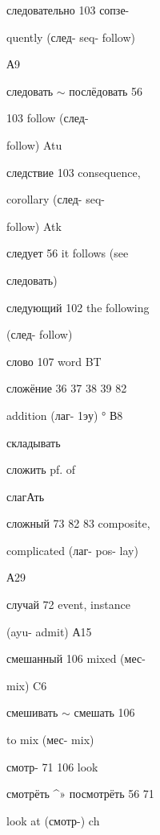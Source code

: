 \clearpage
\thispagestyle{plain}
\begingroup
\cyrillicfont
\fontsize{7.25}{8.25}\selectfont
\setlength{\parindent}{0pt}
\setlength{\parskip}{0pt}
\setlength{\emergencystretch}{1.5em}
\noindent
\begin{minipage}[t]{0.475\textwidth}
\raggedright
\noindent следовательно 103 сопзе-\par
\noindent quently (след- seq- follow)\par
\noindent А9\par
\noindent следовать $\sim$ послёдовать 56\par
{} 103 follow (след-\par
\noindent follow) Atu\par
\noindent следствие 103 consequence,\par
\noindent corollary (след- seq-\par
\noindent follow) Atk\par
\noindent следует 56 it follows (see\par
\noindent следовать)\par
\noindent следующий 102 the following\par
\noindent (след- follow)\par
\noindent слово 107 word BT\par
\noindent сложёние 36 37 38 39 82\par
\noindent addition (лаг- 1эу) ° В8\par
\noindent складывать\par
\noindent сложить pf. of\par
\noindent слагАть\par
\noindent сложный 73 82 83 composite,\par
\noindent complicated (лаг- pos- lay)\par
\noindent А29\par
\noindent случай 72 event, instance\par
\noindent (ayu- admit) А15\par
\noindent смешанный 106 mixed (мес-\par
\noindent mix) C6\par
\noindent смешивать $\sim$ смешать 106\par
\noindent to mix (мес- mix)\par
\noindent смотр- 71 106 look\par
\noindent смотрёть \textasciicircum{}» посмотрёть 56 71\par
{} look at (смотр-) ch\par

\end{minipage}
